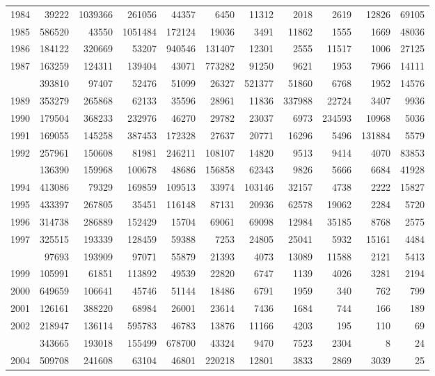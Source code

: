 \documentclass[
]{article}
\begin{document}
\begin{longtable}[t]{lrrrrrrrrrr}
1984 & 39222 & 1039366 & 261056 & 44357 & 6450 & 11312 & 2018 & 2619 & 12826 & 69105\\
1985 & 586520 & 43550 & 1051484 & 172124 & 19036 & 3491 & 11862 & 1555 & 1669 & 48036\\
1986 & 184122 & 320669 & 53207 & 940546 & 131407 & 12301 & 2555 & 11517 & 1006 & 27125\\
1987 & 163259 & 124311 & 139404 & 43071 & 773282 & 91250 & 9621 & 1953 & 7966 & 14111\\
\addlinespace
1988 & 393810 & 97407 & 52476 & 51099 & 26327 & 521377 & 51860 & 6768 & 1952 & 14576\\
1989 & 353279 & 265868 & 62133 & 35596 & 28961 & 11836 & 337988 & 22724 & 3407 & 9936\\
1990 & 179504 & 368233 & 232976 & 46270 & 29782 & 23037 & 6973 & 234593 & 10968 & 5036\\
1991 & 169055 & 145258 & 387453 & 172328 & 27637 & 20771 & 16296 & 5496 & 131884 & 5579\\
1992 & 257961 & 150608 & 81981 & 246211 & 108107 & 14820 & 9513 & 9414 & 4070 & 83853\\
\addlinespace
1993 & 136390 & 159968 & 100678 & 48686 & 156858 & 62343 & 9826 & 5666 & 6684 & 41928\\
1994 & 413086 & 79329 & 169859 & 109513 & 33974 & 103146 & 32157 & 4738 & 2222 & 15827\\
1995 & 433397 & 267805 & 35451 & 116148 & 87131 & 20936 & 62578 & 19062 & 2284 & 5720\\
1996 & 314738 & 286889 & 152429 & 15704 & 69061 & 69098 & 12984 & 35185 & 8768 & 2575\\
1997 & 325515 & 193339 & 128459 & 59388 & 7253 & 24805 & 25041 & 5932 & 15161 & 4484\\
\addlinespace
1998 & 97693 & 193909 & 97071 & 55879 & 21393 & 4073 & 13089 & 11588 & 2121 & 5413\\
1999 & 105991 & 61851 & 113892 & 49539 & 22820 & 6747 & 1139 & 4026 & 3281 & 2194\\
2000 & 649659 & 106641 & 45746 & 51144 & 18486 & 6791 & 1959 & 340 & 762 & 799\\
2001 & 126161 & 388220 & 68984 & 26001 & 23614 & 7436 & 1684 & 744 & 166 & 189\\
2002 & 218947 & 136114 & 595783 & 46783 & 13876 & 11166 & 4203 & 195 & 110 & 69\\
\addlinespace
2003 & 343665 & 193018 & 155499 & 678700 & 43324 & 9470 & 7523 & 2304 & 8 & 24\\
2004 & 509708 & 241608 & 63104 & 46801 & 220218 & 12801 & 3833 & 2869 & 3039 & 25\\

\end{longtable}
\end{document}
